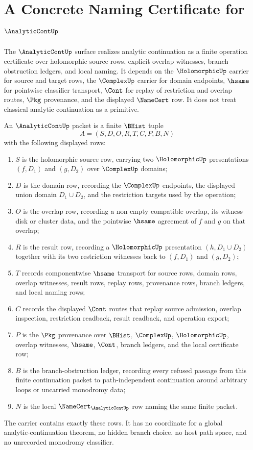 \chapter{A Concrete Naming Certificate for $\AnalyticContUp$}
\label{ch:concrete-instances-analyticcontinuationoperation-namecert}

The $\AnalyticContUp$ surface realizes analytic continuation as a finite operation certificate over holomorphic source rows, explicit overlap witnesses, branch-obstruction ledgers, and local naming. It depends on the $\HolomorphicUp$ carrier for source and target rows, the $\ComplexUp$ carrier for domain endpoints, $\hsame$ for pointwise classifier transport, $\Cont$ for replay of restriction and overlap routes, $\Pkg$ provenance, and the displayed $\NameCert$ row. It does not treat classical analytic continuation as a primitive.

\begin{definition}
\label{def:analytic-continuation-operation-packet}
An $\AnalyticContUp$ packet is a finite $\BHist$ tuple
$$
A=(S,D,O,R,T,C,P,B,N)
$$
with the following displayed rows:
\begin{enumerate}
\item $S$ is the holomorphic source row, carrying two $\HolomorphicUp$ presentations $(f,D_1)$ and $(g,D_2)$ over $\ComplexUp$ domains;
\item $D$ is the domain row, recording the $\ComplexUp$ endpoints, the displayed union domain $D_1\cup D_2$, and the restriction targets used by the operation;
\item $O$ is the overlap row, recording a non-empty compatible overlap, its witness disk or cluster data, and the pointwise $\hsame$ agreement of $f$ and $g$ on that overlap;
\item $R$ is the result row, recording a $\HolomorphicUp$ presentation $(h,D_1\cup D_2)$ together with its two restriction witnesses back to $(f,D_1)$ and $(g,D_2)$;
\item $T$ records componentwise $\hsame$ transport for source rows, domain rows, overlap witnesses, result rows, replay rows, provenance rows, branch ledgers, and local naming rows;
\item $C$ records the displayed $\Cont$ routes that replay source admission, overlap inspection, restriction readback, result readback, and operation export;
\item $P$ is the $\Pkg$ provenance over $\BHist$, $\ComplexUp$, $\HolomorphicUp$, overlap witnesses, $\hsame$, $\Cont$, branch ledgers, and the local certificate row;
\item $B$ is the branch-obstruction ledger, recording every refused passage from this finite continuation packet to path-independent continuation around arbitrary loops or uncarried monodromy data;
\item $N$ is the local $\NameCert_{\AnalyticContUp}$ row naming the same finite packet.
\end{enumerate}
The carrier contains exactly these rows. It has no coordinate for a global analytic-continuation theorem, no hidden branch choice, no host path space, and no unrecorded monodromy classifier.
\end{definition}


